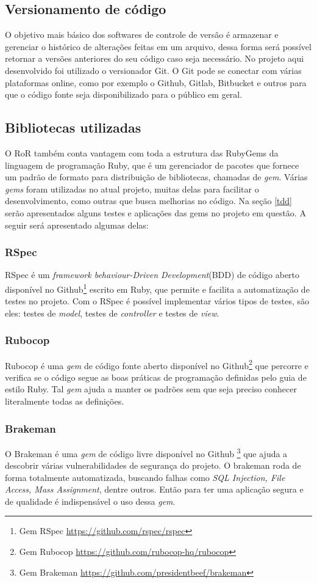 \subsection{Versionamento de código}
O objetivo mais básico dos softwares de controle de versão é armazenar e gerenciar o histórico de alterações feitas em um arquivo, dessa forma será possível retornar a versões anteriores do seu código caso seja necessário. No projeto aqui desenvolvido foi utilizado o versionador Git. O Git pode se conectar com várias plataformas online, como por exemplo o Github, Gitlab, Bitbucket e outros para que o código fonte seja disponibilizado para o público em geral.
\subsection{Bibliotecas utilizadas}
O RoR também conta vantagem com toda a estrutura das RubyGems da linguagem de programação Ruby, que é um gerenciador de pacotes que fornece um padrão de formato para distribuição de bibliotecas, chamadas de \textit{gem}. Várias \textit{gems} foram utilizadas no atual projeto, muitas delas para facilitar o desenvolvimento, como outras que busca melhorias no código. Na seção \ref{tdd} serão apresentados alguns testes e aplicações das gems no projeto em questão. A seguir será apresentado algumas delas:
\subsubsection{RSpec}\label{rspec}
RSpec é um \textit{framework behaviour-Driven Development}(BDD) de código aberto disponível no Github\footnote{Gem RSpec \url{https://github.com/rspec/rspec}} escrito em Ruby, que permite e facilita a automatização de testes no projeto. Com o RSpec é possível implementar vários tipos de testes, são eles: testes de \textit{model}, testes de \textit{controller} e testes de \textit{view}.
\subsubsection{Rubocop}\label{rubocop}
Rubocop é uma \textit{gem} de código fonte aberto disponível no Github\footnote{Gem Rubocop \url{https://github.com/rubocop-hq/rubocop}} que percorre e verifica se o código segue as boas práticas de programação definidas pelo guia de estilo Ruby. Tal \textit{gem} ajuda a manter os padrões sem que seja preciso conhecer literalmente todas as definições.
\subsubsection{Brakeman}\label{brakeman}
O Brakeman é uma \textit{gem} de código livre disponível no Github \footnote{Gem Brakeman \url{https://github.com/presidentbeef/brakeman}} que ajuda a descobrir várias vulnerabilidades de segurança do projeto. O brakeman roda de forma totalmente automatizada, buscando falhas como \textit{SQL Injection, File Access, Mass Assignment}, dentre outros. Então para ter uma aplicação segura e de qualidade é indispensável o uso dessa \textit{gem}.


